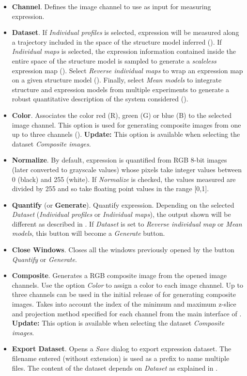 \begin{itemize}
 \item \textbf{Channel}. Defines the image channel to use as input for measuring expression.
 \item \textbf{Dataset}. If \textit{Individual profiles} is selected, expression will be measured along a trajectory included in the space of the structure model inferred (). If \textit{Individual maps} is selected, the expression information contained inside the entire space of the structure model is sampled to generate a \emph{scaleless} expression map (). Select \textit{Reverse individual maps} to wrap an expression map on a given \wingj structure model (). Finally, select \textit{Mean models} to integrate structure and expression models from multiple experiments to generate a robust quantitative description of the system considered ().
 \item \textbf{Color}. Associates the color red (R), green (G) or blue (B) to the selected image channel. This option is used for generating composite images from one up to three channels (). \textbf{Update: } This option is available when selecting the dataset \textit{Composite images}.
 \item \textbf{Normalize}. By default, expression is quantified from RGB 8-bit images (later converted to grayscale values) whose pixels take integer values between 0 (black) and 255 (white). If \textit{Normalize} is checked, the values measured are divided by 255 and so take floating point values in the range [0,1].
 \item \textbf{Quantify} (or \textbf{Generate}). Quantify expression. Depending on the selected \textit{Dataset} (\textit{Individual profiles} or \textit{Individual maps}), the output shown will be different as described in . If \textit{Dataset} is set to \textit{Reverse individual map} or \textit{Mean models}, this button will become a \textit{Generate} button.
 \item \textbf{Close Windows}. Closes all the windows previously opened by the button \textit{Quantify} or \textit{Generate}.
 \item \textbf{Composite}. Generates a RGB composite image from the opened image channels. Use the option \textit{Color} to assign a color to each image channel. Up to three channels can be used in the initial release of \wingj for generating composite images. Takes into account the index of the minimum and maximum z-slice and projection method specified for each channel from the main interface of \wingj. \textbf{Update: } This option is available when selecting the dataset \textit{Composite images}.
 \item \textbf{Export Dataset}. Opens a \textit{Save} dialog to export expression dataset. The filename entered (without extension) is used as a prefix to name multiple files. The content of the dataset depends on \emph{Dataset} as explained in .
\end{itemize}

